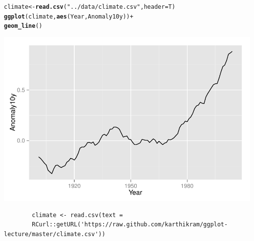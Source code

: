 \documentclass{beamer}\usepackage[]{graphicx}\usepackage[]{color}
\makeatletter
\newcommand{\hlstr}[1]{\textcolor[rgb]{0.192,0.494,0.8}{#1}}%
\newcommand{\hlopt}[1]{\textcolor[rgb]{0,0,0}{#1}}%
\newcommand{\hlstd}[1]{\textcolor[rgb]{0.345,0.345,0.345}{#1}}%
\newcommand{\hlkwb}[1]{\textcolor[rgb]{0.69,0.353,0.396}{#1}}%
\newcommand{\hlkwc}[1]{\textcolor[rgb]{0.333,0.667,0.333}{#1}}%
\newcommand{\hlkwd}[1]{\textcolor[rgb]{0.737,0.353,0.396}{\textbf{#1}}}%
\newenvironment{kframe}{%
 \def\at@end@of@kframe{}%
 \ifinner\ifhmode%
  \def\at@end@of@kframe{\end{minipage}}%
  \begin{minipage}{\columnwidth}%
 \fi\fi%
 \def\FrameCommand##1{\hskip\@totalleftmargin \hskip-\fboxsep
 \colorbox{shadecolor}{##1}\hskip-\fboxsep
     \hskip-\linewidth \hskip-\@totalleftmargin \hskip\columnwidth}%
 \MakeFramed {\advance\hsize-\width
   \@totalleftmargin\z@ \linewidth\hsize
   \@setminipage}}%
 {\par\unskip\endMakeFramed%
 \at@end@of@kframe}
\newenvironment{knitrout}{}{} %
\makeatother
\begin{document}
\begin{frame}[fragile]
\begin{knitrout}\footnotesize
{}\color{fgcolor}\begin{kframe}
\begin{alltt}
\hlstd{climate} \hlkwb{<-} \hlkwd{read.csv}\hlstd{(}\hlstr{"../data/climate.csv"}\hlstd{,} \hlkwc{header} \hlstd{= T)}
\hlkwd{ggplot}\hlstd{(climate,} \hlkwd{aes}\hlstd{(Year, Anomaly10y))} \hlopt{+}
    \hlkwd{geom_line}\hlstd{()}
\end{alltt}
\end{kframe}

{\centering \includegraphics[width=.75\linewidth]{figure/linea_} 

}



\end{knitrout}
\begin{flushright}
\begingroup
    \fontsize{6pt}{12pt}\selectfont
    \begin{verbatim}
        climate <- read.csv(text =
        RCurl::getURL('https://raw.github.com/karthikram/ggplot-lecture/master/climate.csv'))
    \end{verbatim}
\endgroup
\end{flushright}
\end{frame}

\end{document}
